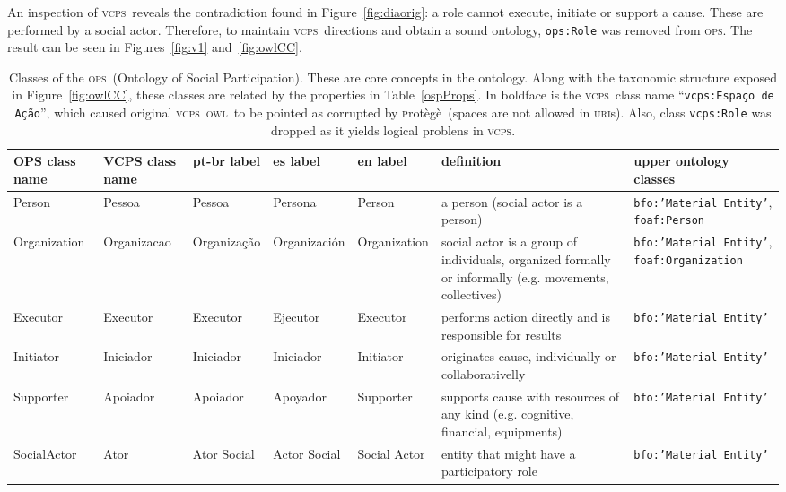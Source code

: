 \documentclass[10pt,letterpaper]{article}
\newcommand{\ops}{\textsc{ops}}
\newcommand{\vcps}{\textsc{vcps}}
\newcommand{\owl}{\textsc{owl}}
\newcommand{\uri}{\textsc{uri}}
\newcommand{\protege}{\textsc{p}rot\`eg\`e}
\begin{document}
An inspection of \vcps\ reveals the contradiction found in Figure~\ref{fig:diaorig}:
a role cannot execute, initiate or support a cause.
These are performed by a social actor.
Therefore, to maintain \vcps\ directions and obtain a sound ontology,
{\tt ops:Role} was removed from \ops.
The result can be seen in Figures~\ref{fig:v1} and~\ref{fig:owlCC}.

\begin{table}[!h]
\begin{adjustwidth}{-2.25in}{0in} %
    \footnotesize
  \centering
  \caption{Classes of the \ops\ (Ontology of Social Participation).
  These are core concepts in the ontology.
  Along with the taxonomic structure exposed in Figure~\ref{fig:owlCC},
  these classes are related by the properties in Table~\ref{ospProps}.
  In boldface is the \vcps\ class name ``{\tt vcps:Espa\c{c}o de A\c{c}\~ao}'',
  which caused original \vcps\ \owl\ to be pointed as corrupted by \protege\ (spaces are not allowed in \uri s).
  Also, class {\tt vcps:Role} was dropped as it yields logical problens in \vcps.}
  \begin{tabular}{|p{1.8cm}|p{1.6cm}||p{2.2cm}|p{2.2cm}|p{1.8cm}||p{4cm}||p{3cm}|}\hline
      {\bf OPS class name} & {\bf VCPS class name} & {\bf pt-br label} & {\bf es label} & {\bf en label} & {\bf definition} & {\bf upper ontology classes} \\\hline\hline
      Person & Pessoa & Pessoa & Persona & Person & a person (social actor is a person) & {\tt bfo:'Material Entity'}, {\tt foaf:Person} \\ \hline
      Organization & Organizacao & Organiza\c{c}\~ao & Organizaci\'on & Organization & social actor is a group of individuals, organized formally or informally (e.g. movements, collectives) & {\tt bfo:'Material Entity'}, {\tt foaf:Organization} \\ \hline \hline
Executor & Executor & Executor & Ejecutor & Executor & performs action directly and is responsible for results & {\tt bfo:'Material Entity'} \\ \hline
Initiator & Iniciador & Iniciador & Iniciador & Initiator & originates cause, individually or collaborativelly & {\tt bfo:'Material Entity'} \\ \hline
      Supporter & Apoiador & Apoiador & Apoyador & Supporter & supports cause with resources of any kind (e.g. cognitive, financial, equipments) & {\tt bfo:'Material Entity'} \\ \hline
SocialActor & Ator & Ator Social & Actor Social & Social Actor & entity that might have a participatory role & {\tt bfo:'Material Entity'} \\ \hline \hline

\end{tabular}
\end{adjustwidth}
\end{table}
\end{document}
